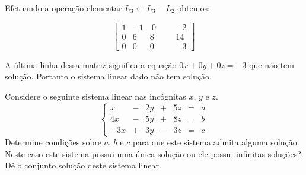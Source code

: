 \begin{solution}
Efetuando a operação elementar $L_3 \leftarrow L_3 - L_2$ obtemos:

$$ \left[\begin{array}{rrrr|rr}
	1 &  -1 & \  0 & & &  -2  \\
	0 &   6 &    8 & & &  14  \\
	0 &   0 &    0 & & &  -3  \end{array}\right] $$

A última linha dessa matriz significa a equação $0x + 0y + 0z = -3$ que não tem solução.
Portanto o sistema linear dado não tem solução.
\end{solution}

\begin{problem}
Considere o seguinte sistema linear nas incógnitas $x$, $y$ e $z$.
$$\left\{\begin{array}{rrrrrrr}
  x & - & 2y & + & 5z & = & a \\
 4x & - & 5y & + & 8z & = & b \\
-3x & + & 3y & - & 3z & = & c \end{array}\right. $$
Determine condições sobre $a$, $b$ e $c$ para que este sistema admita alguma solução. 
Neste caso este sistema possui uma única solução ou ele possui infinitas soluções? \linebreak
Dê o conjunto solução deste sistema linear.
\end{problem}
